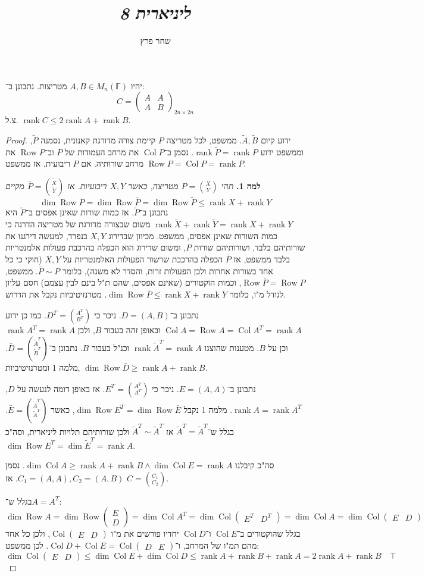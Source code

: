 \documentclass[]{article}
\author{שחר פרץ}
\title{\textit{ליניארית 8}}
\DeclareMathOperator\col   {Col}
\newcommand\F         {\mathbb{F}}
\newcommand\pms[1]    {\begin{pmatrix}
		#1
\end{pmatrix}}
\DeclareMathOperator{\rk}     {rank}
\DeclareMathOperator{\cols}   {Col}
\DeclareMathOperator{\rows}   {Row}
\newcommand\tl    {\tilde}
\begin{document}
	\maketitle
	\section{}
	יהיו $A, B \in M_n(\F)$ מטריצות. נתבונן ב־: 
	\[ C = \pms{A & A \\ A & B}_{2n \times 2n} \]
	צ.ל. $\rk C \le 2\rk A + \rk B$. 
	\begin{proof}
			ידוע קיום $\tl A, \tl B$. ממשפט, לכל מטריצה $P$ קיימת צורה מדורגת קאנונית, נסמנה $\tl P$, וממשפט ידוע $\rk \tl P = \rk P$. נסמן ב־$\cols P$ את מרחב העמודות של $P$ וב־$\rows P$ את מרחב שורותיה. אם $P$ ריבועית, אז ממשפט $\rows P = \cols P = \rk P$. 
			
			
			
			\textbf{למה 1. }\textit{תהי $P = \binom{X}{Y}$ מטריצה, כאשר $X, Y$ ריבועיות. אז $\bar P = \binom{\tl X }{\tl Y}$ מקיים }
			\[\dim \rows P = \dim \rows \bar P = \dim \rows \tl P \le \rk X + \rk Y\]
			נתבונן ב־$\tl P$. 
			אז כמות שורות שאינן אפסים ב־$\tl P$ היא $\rk \tl X + \rk \tl Y = \rk X + \rk Y$ משום שבצורה מדורגת של מטריצה הדרגה כי כמות השורות שאינן אפסים, ממשפט. מכיוון שבדירוג $X, Y$ בנפרד, למעשה דירגנו את שורותיהם בלבד, ושורותיהם שורות $P$, ומשום שדירוג הוא הכפלה בהרכבת פעולות אלמנטריות בלבד ממשפט, אז $\bar P$ הכפלה בהרכבת שרשור הפעולות האלמנטריות על $X, Y$ (חוקי כי כל אחד בשורות אחרות ולכן הפעולות זרות, והסדר לא משנה), כלומר $\bar P \sim P$. ממשפט, $\rows \bar P = \rows P$, וכמות הוקטורים (שאינם אפסים, שהם ת"ל בינם לבין עצמם) חסם עליון לגודל מ"ו, כלומר $\dim \rows \bar P \le \rk X + \rk Y$. מטרנזיטיביות נקבל את הדרוש. 
			
			נתבונן ב־$D = (A, B)$. ניכר כי $D^T = \binom{A^T}{B^T}$. כמו כן ידוע $\cols A = \rows A = \cols A^T = \rk A$ ובאופן זהה בעבור $B$, ולכן $\rk A^T = \rk A$ וכן על $B$. מטענות שהוצגו $\rk \tl A^T = \rk A$ וכנ"ל בעבור $B$. נתבונן ב־$\bar D = \binom{\tl A^T}{\tl B^T}$. מלמה 1 ומטרנזיטיביות, $\dim \rows \bar D \ge \rk A + \rk B$. 
			
			נתבונן ב־$E = (A, A)$. ניכר כי $E^T = \binom{A^T}{A^T}$. אז באופן דומה לנעשה על $D$, $\rk A = \rk A^T$. מלמה 1 נקבל $\dim \rows E^T = \dim \rows \bar E$, כאשר $\bar E = \binom{\tl A^T}{\tl A^T}$. בגלל ש־$\tl A^T = \tl A^T$ אז $\tl A^T \sim \tl A^T$ ולכן שורותיהם תלויות ליניארית, וסה"כ $\dim \rows E^T = \dim \tl E^T = \rk A$. 
			
			סה"כ קיבלנו $\dim \col A \ge \rk A + \rk B \land \dim \col E = \rk A$. נסמן $C_1 = (A, A), C_2 = (A, B)$. אז $C = \binom{C_1}{C_2}$. 
			
			בגלל ש־$A = A^T$:
			\[ \dim \rows A = \dim \rows \pms{E \\ D} = \dim \cols A^T = \dim \cols \pms{E^T & D^T} = \dim \cols A = \dim \cols\pms{E & D} \]
			בגלל שהוקטורים ב־$\col E$ ו־$\col D$ יחדיו פורשים את מ"ו $\col \pms{E & D}$, ולכן כל אחד מהם תמ"ו של המרחב, ו־$\col D + \col E = \col \pms{D & E}$. לכן ממשפט: 
			\[ \dim \cols \pms{E & D} \le \dim \col E + \dim \col D \le \rk A + \rk B + \rk A = 2\rk A + \rk B \quad \top \]
	\end{proof}
	
\end{document}
